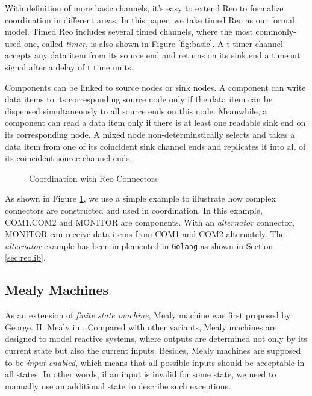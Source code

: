 \documentclass[conference, a4paper]{IEEEtran}
\begin{document}
With definition of more basic channels, it's easy to extend Reo to formalize coordination in
different areas. In this paper, we take timed Reo\cite{DBLP:conf/sefm/ArbabBBR04} as our formal
model. Timed Reo includes several timed channels, where the most commonly-used one, called
\emph{timer}, is also shown in Figure \ref{fig:basic}. A t-timer channel accepts any data item from
its source end and returns on its sink end a timeout signal after a delay of t time units.

Components can be linked to source nodes or sink nodes. A component can write data items to its
corresponding source node only if the data item can be dispensed simultaneously to all source ends
on this node. Meanwhile, a component can read a data item only if there is at least one readable
sink end on its corresponding node. A mixed node non-determinstically selects and takes a data item
from one of its coincident sink channel ends and replicates it into all of its coincident source
channel ends.

\begin{figure}[h]
  \begin{center}
    
  \end{center}
  \caption{Coordination with Reo Connectors}
  \label{fig:reoconnector}
\end{figure}

As shown in Figure \ref{fig:reoconnector}, we use a simple example to illustrate how complex
connectors are constructed and used in coordination. In this example, COM1,COM2 and
MONITOR are components. With an \emph{alternator} connector, MONITOR can receive data items from
COM1 and COM2 alternately. The \emph{alternator} example has been implemented in \texttt{Golang} as
shown in Section \ref{sec:reolib}.


\subsection{Mealy Machines}

As an extension of \emph{finite state machine}, Mealy machine was first proposed by George. H. Mealy
in \cite{George1955A}. Compared with other variants, Mealy machines are designed to model
reactive systems, where outputs are determined not only by its current state but also the current
inputs. Besides, Mealy machines are supposed to be \emph{input enabled}, which means that all
possible inputs should be acceptable in all states. In other words, if an input is invalid for some
state, we need to manually use an additional state to describe such exceptions.
\end{document}
